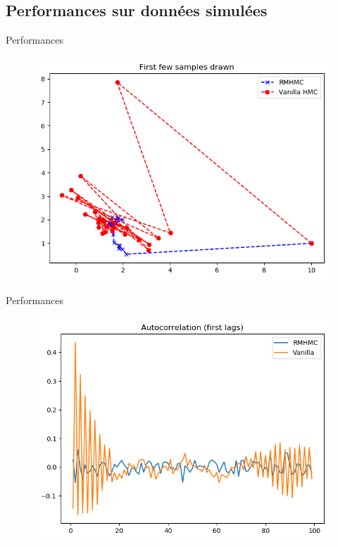 \documentclass{beamer}
\begin{document}
\subsection{Performances sur données simulées}
\begin{frame}{Performances}
	\begin{figure}
	\includegraphics[scale=0.4]{figs/conv_2d_6leaps_vs_100.png}
	\end{figure}
\end{frame}

\begin{frame}{Performances}
	\begin{figure}
	\includegraphics[scale=0.4]{figs/autocorr_mean_100_100.png}
	\end{figure}
\end{frame}
\end{document}
